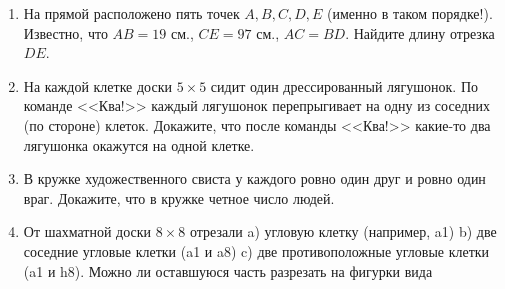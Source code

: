\documentclass{article}
\begin{document}
\begin{enumerate}[label*=\protect\fbox{\arabic{enumi}}]
\item На прямой расположено пять точек $A, B, C, D, E$ (именно в таком порядке!). Известно, что $AB = 19$ см., $CE = 97$ см., $AC = BD$. Найдите длину отрезка $DE$.

\item На каждой клетке доски $5 \times 5$ сидит один дрессированный лягушонок. По команде <<Ква!>> каждый лягушонок перепрыгивает на одну из соседних (по стороне) клеток. Докажите, что после команды <<Ква!>> какие-то два лягушонка окажутся на одной клетке.

\item В кружке художественного свиста у каждого ровно один друг и ровно один враг. Докажите, что в кружке четное число людей.

\item От шахматной доски $8 \times 8$ отрезали a) угловую клетку (например, a1) b) две соседние угловые клетки (a1 и a8) c) две противоположные угловые клетки (a1 и h8). Можно ли оставшуюся часть разрезать на фигурки вида

\end{enumerate}
\end{document}
